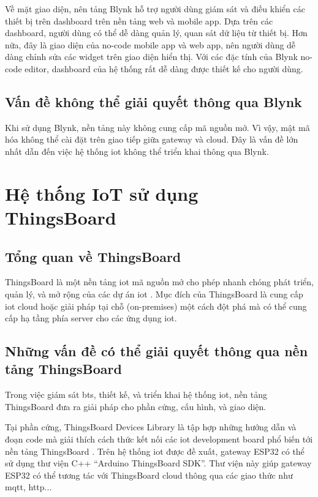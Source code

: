 Về mặt giao diện, nên tảng Blynk hỗ trợ người dùng giám sát và điều khiển các thiết bị trên dashboard trên nền tảng web và mobile app. Dựa trên các dashboard, người dùng có thể dễ dàng quản lý, quan sát dữ liệu từ thiết bị. Hơn nữa, đây là giao diện của no-code mobile app và web app, nên người dùng dễ dàng chỉnh sửa các widget trên giao diện hiển thị. Với các đặc tính của Blynk no-code editor, dashboard của hệ thống rất dễ dàng được thiết kế cho người dùng.

\subsection{Vấn đề không thể giải quyết thông qua Blynk}

Khi sử dụng Blynk, nền tảng này không cung cấp mã nguồn mở. Vì vậy, mật mã hóa không thể cài đặt trên giao tiếp giữa gateway và cloud. Đây là vấn đề lớn nhất dẫn đến việc hệ thống \acrshort{iot} không thể triển khai thông qua Blynk.

\section{Hệ thống IoT sử dụng ThingsBoard}

\subsection{Tổng quan về ThingsBoard}

ThingsBoard là một nền tảng \acrshort{iot} mã nguồn mở cho phép nhanh chóng phát triển, quản lý, và mở rộng của các dự án \acrshort{iot} \cite{ThingsBoard-Def-Overview}. Mục đích của ThingsBoard là cung cấp \acrshort{iot} cloud hoặc giải pháp tại chỗ (on-premises) một cách đột phá mà có thể cung cấp hạ tầng phía server cho các ứng dụng \acrshort{iot}.

\subsection{Những vấn đề có thể giải quyết thông qua nền tảng ThingsBoard}

Trong việc giám sát \acrshort{bts}, thiết kế, và triển khai hệ thống \acrshort{iot}, nền tảng ThingsBoard đưa ra giải pháp cho phần cứng, cấu hình, và giao diện.

Tại phần cứng, ThingsBoard Devices Library là tập hợp những hướng dẫn và đoạn code mà giải thích cách thức kết nối các \acrshort{iot} development board phổ biến tới nền tảng ThingsBoard \cite{ThingsBoard-Devices-Lib-Overview}. Trên hệ thống \acrshort{iot} được đề xuất, gateway ESP32 có thể sử dụng thư viện C++ ``Arduino ThingsBoard SDK''. Thư viện này giúp gateway ESP32 có thể tương tác với ThingsBoard cloud thông qua các giao thức như \acrshort{mqtt}, \acrfull{http}...

